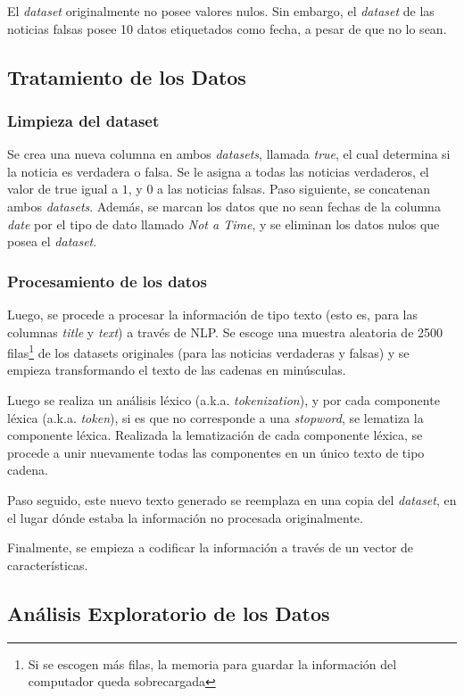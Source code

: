 {El \textit{dataset} originalmente no posee valores nulos. Sin embargo, el \textit{dataset} de las noticias falsas posee 10 datos etiquetados como fecha, a pesar de que no lo sean.


\subsection{Tratamiento de los Datos}

\subsubsection{Limpieza del dataset}
Se crea una nueva columna en ambos \textit{datasets}, llamada \textit{true}, el cual determina si la noticia es verdadera o falsa. Se le asigna a todas las noticias verdaderos, el valor de true igual a $1$, y $0$ a las noticias falsas. Paso siguiente, se concatenan ambos \textit{datasets}. Además, se marcan los datos que no sean fechas de la columna \textit{date} por el tipo de dato llamado \textit{Not a Time}, y se eliminan los datos nulos que posea el \textit{dataset}.

\subsubsection{Procesamiento de los datos}
Luego, se procede a procesar la información de tipo texto (esto es, para las columnas \textit{title} y \textit{text}) a través de NLP. Se escoge una muestra aleatoria de 2500 filas\footnote{Si se escogen más filas, la memoria para guardar la información del computador queda sobrecargada} de los datasets originales (para las noticias verdaderas y falsas) y se empieza transformando el texto de las cadenas en minúsculas. 

Luego se realiza un análisis léxico (a.k.a. \textit{tokenization}), y por cada componente léxica (a.k.a. \textit{token}), si es que no corresponde a una \textit{stopword}, se lematiza la componente léxica. Realizada la lematización de cada componente léxica, se procede a unir nuevamente todas las componentes en un único texto de tipo cadena.

Paso seguido, este nuevo texto generado se reemplaza en una copia del \textit{dataset}, en el lugar dónde estaba la información no procesada originalmente.

Finalmente, se empieza a codificar la información a través de un vector de características. 

\subsection{Análisis Exploratorio de los Datos}

}
